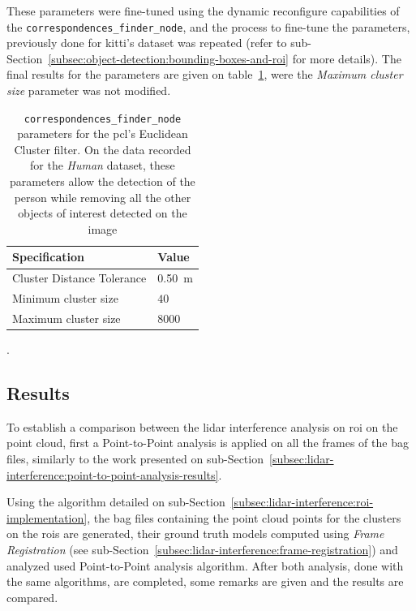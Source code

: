 These parameters were fine-tuned using the dynamic reconfigure capabilities of the \texttt{correspondences\_finder\_node}, and the process to fine-tune the parameters, previously done for \ac{kitti}'s dataset was repeated (refer to sub-Section~\ref{subsec:object-detection:bounding-boxes-and-roi} for more details). The final results for the parameters are given on table~\ref{tab:experimental-euclidian-cluster-specs}, were the \textit{Maximum cluster size} parameter was not modified.


\begin{table}[H]
	\centering
	\renewcommand{\arraystretch}{1.2}
	\begin{tabular}{@{}p{6cm}l@{}}
	 \toprule
	 Specification & Value \\
	 \midrule
	 Cluster Distance Tolerance & \SI{0.50}{\meter} \\
	 Minimum cluster size & $40$ \\
	 Maximum cluster size & $8000$ \\
	 \bottomrule
	\end{tabular}
	\caption[Euclidian cluster parameters to select only the \ac{roi} containing the person on the \textit{Human} dataset.] {\texttt{correspondences\_finder\_node} parameters for the \ac{pcl}'s Euclidean Cluster filter. On the data recorded for the \textit{Human} dataset, these parameters allow the detection of the person while removing all the other objects of interest detected on the image}.
	\label{tab:experimental-euclidian-cluster-specs}
\end{table}

\subsection{Results}
To establish a comparison between the \ac{lidar} interference analysis on \ac{roi} on the point cloud, first a Point-to-Point analysis is applied on all the frames of the bag files, similarly to the work presented on sub-Section~\ref{subsec:lidar-interference:point-to-point-analysis-results}.

Using the algorithm detailed on sub-Section~\ref{subsec:lidar-interference:roi-implementation}, the bag files containing the point cloud points for the clusters on the \acp{roi} are generated, their ground truth models computed using \textit{Frame Registration} (see sub-Section~\ref{subsec:lidar-interference:frame-registration}) and analyzed used Point-to-Point analysis algorithm. After both analysis, done with the same algorithms, are completed, some remarks are given and the results are compared.

